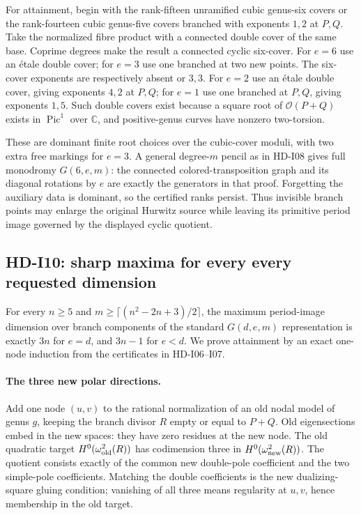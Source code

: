 For attainment, begin with the rank-fifteen unramified cubic genus-six
covers or the rank-fourteen cubic genus-five covers branched with
exponents $1,2$ at $P,Q$. Take the normalized fibre product with a
connected double cover of the same base. Coprime degrees make the
result a connected cyclic six-cover. For $e=6$ use an \'etale double
cover; for $e=3$ use one branched at two new points. The six-cover
exponents are respectively absent or $3,3$. For $e=2$ use an \'etale
double cover, giving exponents $4,2$ at $P,Q$; for $e=1$ use one
branched at $P,Q$, giving exponents $1,5$. Such double covers exist
because a square root of $\mathcal O(P+Q)$ exists in
$\operatorname{Pic}^1$ over $\mathbb C$, and positive-genus curves
have nonzero two-torsion.

These are dominant finite root choices over the cubic-cover moduli,
with two extra free markings for $e=3$. A general degree-$m$ pencil
as in HD-I08 gives full monodromy $G(6,e,m)$: the connected
colored-transposition graph and its diagonal rotations by $e$ are
exactly the generators in that proof. Forgetting the auxiliary data
is dominant, so the certified ranks persist. Thus invisible branch
points may enlarge the original Hurwitz source while leaving its
primitive period image governed by the displayed cyclic quotient.

\subsection{HD-I10: sharp maxima for every every requested dimension}
\label{hd-i10}

For every $n\ge5$ and
$m\ge\lceil(n^2-2n+3)/2\rceil$, the maximum period-image dimension
over branch components of the standard $G(d,e,m)$ representation is
exactly $3n$ for $e=d$, and $3n-1$ for $e<d$. We prove attainment by
an exact one-node induction from the certificates in HD-I06--I07.

\paragraph{The three new polar directions.}
Add one node $(u,v)$ to the rational normalization of an old nodal
model of genus $g$, keeping the branch divisor $R$ empty or equal to
$P+Q$. Old eigensections embed in the new spaces: they have zero
residues at the new node. The old quadratic target
$H^0(\omega_{\rm old}^2(R))$ has codimension three in
$H^0(\omega_{\rm new}^2(R))$. The quotient consists exactly of the
common new double-pole coefficient and the two simple-pole
coefficients. Matching the double coefficients is the new
dualizing-square gluing condition; vanishing of all three means
regularity at $u,v$, hence membership in the old target.

